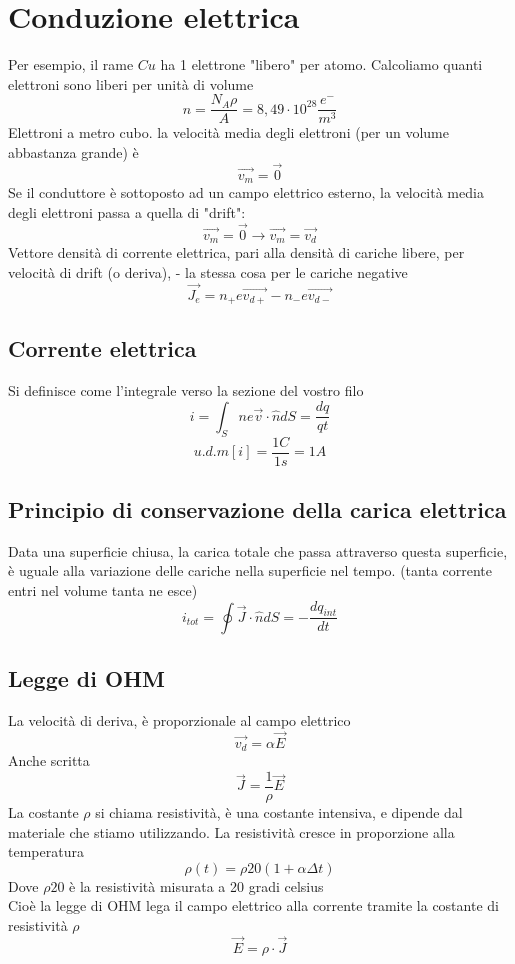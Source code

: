 \documentclass[a4paper]{report}
\begin{document}
  \section{Conduzione elettrica}
  Per esempio, il rame $Cu$ ha 1 elettrone "libero" per atomo. Calcoliamo quanti elettroni sono liberi per unità di volume
  \[ n = \frac{N_A \rho}{ A} = 8,49 \cdot 10^{28} \frac{e^-}{m^3} \]
  Elettroni a metro cubo. la velocità media degli elettroni (per un volume abbastanza grande) è
  \[\vec{v_m} = \vec{0}\]
  Se il conduttore è sottoposto ad un campo elettrico esterno, la velocità media degli elettroni passa a quella di "drift":
  \[ \vec{v_m} = \vec{0} \longrightarrow \vec{v_m} = \vec{v_d} \]
  Vettore densità di corrente elettrica, pari alla densità di cariche libere, per velocità di drift (o deriva), - la stessa cosa per le cariche negative
  \[ \vec{J_e} = n_+ e \vec{v_{d+}} - n_- e \vec{v_{d-}}\]

  \subsection{Corrente elettrica}
  Si definisce come l'integrale verso la sezione del vostro filo
  \[ i = \int_S n e \vec{v} \cdot \hat{n} dS = \frac{dq}{qt}\]
  \[ u.d.m[i]=\frac{1C}{1s}= 1A \]

  \subsection{Principio di conservazione della carica elettrica}
  Data una superficie chiusa, la carica totale che passa attraverso questa superficie, è uguale alla variazione delle cariche nella superficie nel tempo. (tanta corrente entri nel volume tanta ne esce)
  \[ i_{tot} = \oint \vec{J} \cdot \hat{n} dS = -\frac{dq_{int}}{dt} \]

  \subsection{Legge di OHM}
  La velocità di deriva, è proporzionale al campo elettrico
  \[ \vec{v_d} = \alpha \vec{E} \]
  Anche scritta
  \[ \vec{J} = \frac{1}{\rho} \vec{E} \]
  La costante $\rho$ si chiama resistività, è una costante intensiva, e dipende dal materiale che stiamo utilizzando.
  La resistività cresce in proporzione alla temperatura
  \[ \rho(t) = \rho{20}(1 + \alpha \Delta t) \]
  Dove $\rho{20}$ è la resistività misurata a 20 gradi celsius\\
  Cioè la legge di OHM lega il campo elettrico alla corrente tramite la costante di resistività $\rho$
  \[ \vec{E} = \rho \cdot \vec{J} \]
\end{document}
